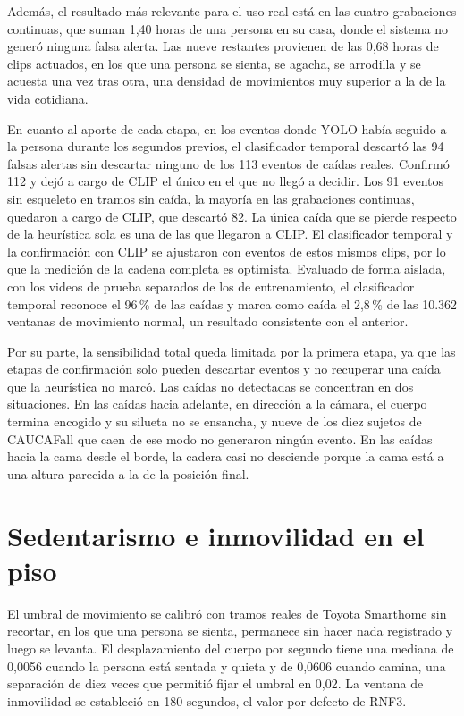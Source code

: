 Además, el resultado más relevante para el uso real está en las cuatro grabaciones continuas, que suman 1,40 horas de una persona en su casa, donde el sistema no generó ninguna falsa alerta.
Las nueve restantes provienen de las 0,68 horas de clips actuados, en los que una persona se sienta, se agacha, se arrodilla y se acuesta una vez tras otra, una densidad de movimientos muy superior a la de la vida cotidiana.

En cuanto al aporte de cada etapa, en los eventos donde YOLO había seguido a la persona durante los segundos previos, el clasificador temporal descartó las 94 falsas alertas sin descartar ninguno de los 113 eventos de caídas reales.
Confirmó 112 y dejó a cargo de CLIP el único en el que no llegó a decidir.
Los 91 eventos sin esqueleto en tramos sin caída, la mayoría en las grabaciones continuas, quedaron a cargo de CLIP, que descartó 82.
La única caída que se pierde respecto de la heurística sola es una de las que llegaron a CLIP.
El clasificador temporal y la confirmación con CLIP se ajustaron con eventos de estos mismos clips, por lo que la medición de la cadena completa es optimista.
Evaluado de forma aislada, con los videos de prueba separados de los de entrenamiento, el clasificador temporal reconoce el 96\,\% de las caídas y marca como caída el 2,8\,\% de las 10.362 ventanas de movimiento normal, un resultado consistente con el anterior.

Por su parte, la sensibilidad total queda limitada por la primera etapa, ya que las etapas de confirmación solo pueden descartar eventos y no recuperar una caída que la heurística no marcó.
Las caídas no detectadas se concentran en dos situaciones.
En las caídas hacia adelante, en dirección a la cámara, el cuerpo termina encogido y su silueta no se ensancha, y nueve de los diez sujetos de CAUCAFall que caen de ese modo no generaron ningún evento.
En las caídas hacia la cama desde el borde, la cadera casi no desciende porque la cama está a una altura parecida a la de la posición final.

\section{Sedentarismo e inmovilidad en el piso}
\label{sec:pruebas_inmovilidad}

El umbral de movimiento se calibró con tramos reales de Toyota Smarthome sin recortar, en los que una persona se sienta, permanece sin hacer nada registrado y luego se levanta.
El desplazamiento del cuerpo por segundo tiene una mediana de 0,0056 cuando la persona está sentada y quieta y de 0,0606 cuando camina, una separación de diez veces que permitió fijar el umbral en 0,02.
La ventana de inmovilidad se estableció en 180 segundos, el valor por defecto de RNF3.

